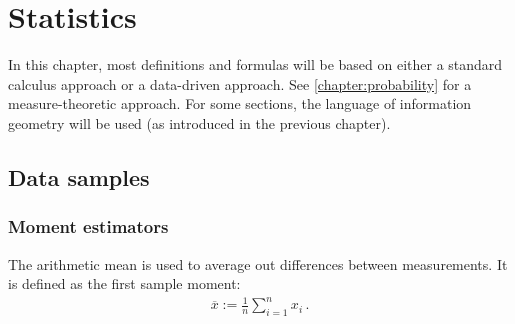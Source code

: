 \chapter{Statistics}\label{chapter:statistics}

    In this chapter, most definitions and formulas will be based on either a standard calculus approach or a data-driven approach. See \cref{chapter:probability} for a measure-theoretic approach. For some sections, the language of information geometry will be used (as introduced in the previous chapter).

    \minitoc

\section{Data samples}
\subsection{Moment estimators}

    \begin{example}\label{statistics:arithmetic_mean}
        The arithmetic mean is used to average out differences between measurements. It is defined as the first sample moment:
        \begin{gather}
            \overline{x} := \frac{1}{n}\sum_{i=1}^nx_i\,.
        \end{gather}
    \end{example}

